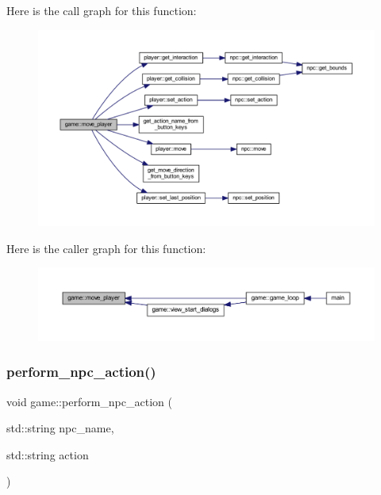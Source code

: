 Here is the call graph for this function\+:
\nopagebreak
\begin{figure}[H]
\begin{center}
\leavevmode
\includegraphics[width=350pt]{classgame_ab13015cdc535671de1dd7a5a7970a238_cgraph}
\end{center}
\end{figure}
Here is the caller graph for this function\+:
\nopagebreak
\begin{figure}[H]
\begin{center}
\leavevmode
\includegraphics[width=350pt]{classgame_ab13015cdc535671de1dd7a5a7970a238_icgraph}
\end{center}
\end{figure}
\mbox{\label{classgame_a5b71f711786b1b48343dd02d31551a69}} 
\subsubsection{\texorpdfstring{perform\+\_\+npc\+\_\+action()}{perform\_npc\_action()}}
{\footnotesize\ttfamily void game\+::perform\+\_\+npc\+\_\+action (\begin{DoxyParamCaption}\item[{std\+::string}]{npc\+\_\+name,  }\item[{std\+::string}]{action }\end{DoxyParamCaption})\hspace{0.3cm}{\ttfamily [private]}}



